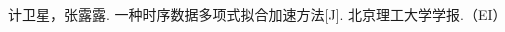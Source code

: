 
\begin{publications}{99}

    \item\textsc{计卫星，张露露}. {一种时序数据多项式拟合加速方法}[J].
      北京理工大学学报.（EI）
    
\end{publications}
